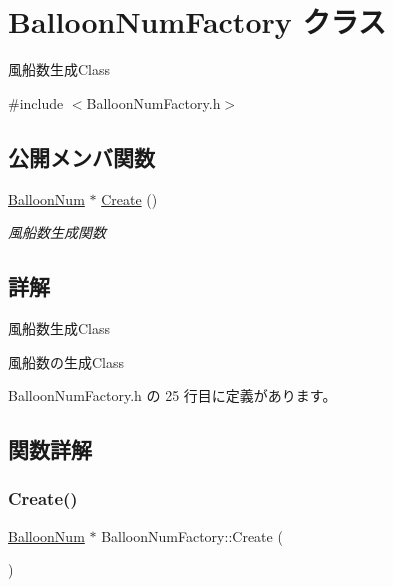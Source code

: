 \hypertarget{class_balloon_num_factory}{}\section{Balloon\+Num\+Factory クラス}
\label{class_balloon_num_factory}


風船数生成\+Class  




{\ttfamily \#include $<$Balloon\+Num\+Factory.\+h$>$}

\subsection*{公開メンバ関数}
\begin{DoxyCompactItemize}
\item 
\mbox{\hyperlink{class_balloon_num}{Balloon\+Num}} $\ast$ \mbox{\hyperlink{class_balloon_num_factory_ab705064d8584283923166333f1a5733f}{Create}} ()
\begin{DoxyCompactList}\small\item\em 風船数生成関数 \end{DoxyCompactList}\end{DoxyCompactItemize}


\subsection{詳解}
風船数生成\+Class 

風船数の生成\+Class 

 Balloon\+Num\+Factory.\+h の 25 行目に定義があります。



\subsection{関数詳解}
\mbox{\label{class_balloon_num_factory_ab705064d8584283923166333f1a5733f}} 
\subsubsection{\texorpdfstring{Create()}{Create()}}
{\footnotesize\ttfamily \mbox{\hyperlink{class_balloon_num}{Balloon\+Num}} $\ast$ Balloon\+Num\+Factory\+::\+Create (\begin{DoxyParamCaption}{ }\end{DoxyParamCaption})}



